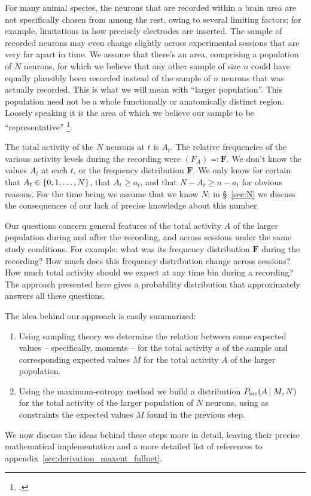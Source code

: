 \documentclass[\ifafour a4paper,12pt,\else a5paper,10pt,\fi%
onecolumn,oneside,article,%
british%
]{memoir}
\theoremstyle{remark}
\theoremstyle{innote}
\newcommand*{\citep}{\footcites}
\newcommand*{\defs}{\eqqcolon}
\renewcommand*{\ge}{\geqslant}%
\DeclarePairedDelimiter\set{\{}{\}}
\renewcommand*{\|}{\nonscript\,\vert\nonscript\;\mathopen{}}
\newcommand*{\sect}{\S}%
\newcommand*{\yAv}{A}
\newcommand*{\yav}{a}
\newcommand*{\yFF}{F}
\newcommand*{\yF}{\bm{\yFF}}
\newcommand*{\ya}{\yav}%
\newcommand*{\yA}{\yAv}%
\newcommand*{\px}{P_{\text{me}}}
\begin{document}
For many animal species, the neurons that are recorded within a brain area
are not specifically chosen from among the rest, owing to several limiting
factors; for example, limitations in how precisely electrodes are inserted.
The sample of recorded neurons may even change slightly across experimental
sessions that are very far apart in time. We assume that there's an area,
comprising a population of $N$ neurons, for which we believe that any other
sample of size $n$ could have equally plausibly been recorded instead of
the sample of $n$ neurons that was actually recorded. This is what we will
mean with \enquote{larger population}. This population need not be a whole
functionally or anatomically distinct region. Loosely speaking it is the
area of which we believe our sample to be \enquote{representative}
\citep[with the warnings that accompany that term:][]{kruskaletal1979c}.

The total activity of the $N$ neurons at $t$ is $\yA_{t}$. The relative
frequencies of the various activity levels during the recording were
$(\yFF_{\yA}) \defs \yF$. We don't know the values $\yA_{t}$ at each $t$,
or the frequency distribution $\yF$. We only know for certain that
$\yA_{t} \in \set{0, 1, \dotsc, N}$, that $\yA_{t} \ge \ya_{t}$, and that
$N-\yA_{t} \ge n-\ya_{t}$ for obvious reasons. For the time being we assume
that we know $N$; in \sect~\ref{sec:N} we discuss the consequences of our
lack of precise knowledge about this number.

Our questions concern general features of the total activity $\yA$ of the
larger population during and after the recording, and across sessions under
the same study conditions. For example: what was its frequency distribution
$\yF$ during the recording? How much does this frequency distribution
change across sessions? How much total activity should we expect at any
time bin during a recording? The approach presented here gives a
probability distribution that approximately answers all these questions.


\bigskip

The idea behind our approach is easily summarized:
\begin{enumerate}[label=(\alph*)]
\item\label{item:sample_step} Using sampling theory we determine the
  relation between some expected values -- specifically, moments -- for the
  total activity $\ya$ of the sample and corresponding expected values $M$
  for the total activity $\yA$ of the larger population.
\item\label{item:maxent_step} Using the maximum-entropy method we build a
  distribution $\px(\yA \| M, N)$ for the total activity of the larger
  population of $N$ neurons, using as constraints the expected values $M$
  found in the previous step.
\end{enumerate}
We now discuss the ideas behind these steps more in detail, leaving their
precise mathematical implementation and a more detailed list of references
to appendix~\ref{sec:derivation_maxent_fullnet}.
\end{document}
